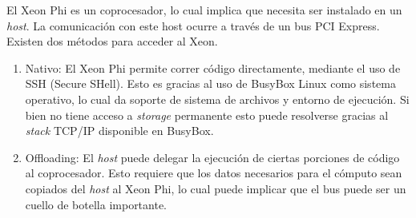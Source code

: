 El Xeon Phi es un coprocesador, lo cual implica que necesita ser instalado en un \textit{host}. La comunicación con este host
ocurre a través de un bus PCI Express. Existen dos métodos para acceder al Xeon.

\begin{enumerate}
    \item Nativo: El Xeon Phi permite correr código directamente, mediante el uso de SSH (Secure SHell). Esto es gracias al
    uso de BusyBox Linux como sistema operativo, lo cual da soporte de sistema de archivos y entorno de ejecución. Si bien no
    tiene acceso a \textit{storage} permanente esto puede resolverse gracias al \textit{stack} TCP/IP disponible en BusyBox.
    \item Offloading: El \textit{host} puede delegar la ejecución de ciertas porciones de código al coprocesador. Esto requiere
    que los datos necesarios para el cómputo sean copiados del \textit{host} al Xeon Phi, lo cual puede implicar que el bus puede
    ser un cuello de botella importante.
\end{enumerate}
